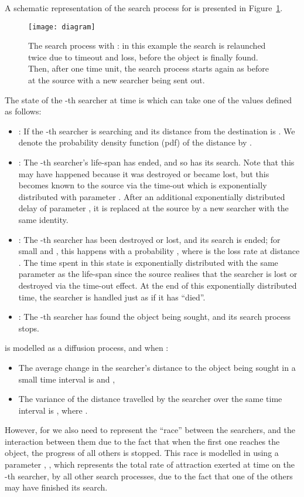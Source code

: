 \documentclass[journal]{IEEEtran}
\begin{document}
A schematic representation of the search process for  is presented in Figure~\ref{diagram}. \begin{figure}[t]\centering
   \texttt{[image: diagram]}
   \caption{The search process with : in this example the search is relaunched twice due to timeout and loss, before the object is finally found. Then, after one time unit, the search process starts again as before at the source with a new searcher being sent out.} \label{diagram}
\end{figure}The state of the -th searcher at time  is  which can take one of the values  defined as follows:
\begin{itemize}
\item : If the -th searcher is searching and its distance from the destination is . We denote the probability density function (pdf) of the distance  by .

\item : The -th searcher's life-span has ended, and so has its search. Note that this may have happened because it was destroyed or became lost, but this becomes known to the source via the time-out which is exponentially distributed with parameter . After an additional exponentially distributed delay of parameter , it is replaced at the source by a new searcher with the same identity.

\item : The -th searcher has been destroyed or lost, and its search is ended; for small  and , this happens with a probability , where  is the loss rate at distance . The time spent in this state is exponentially distributed with the same parameter  as the life-span since the source realises that the searcher is lost or destroyed via the time-out effect. At the end of this exponentially distributed time, the searcher is handled just as if it has ``died''.
\item : The -th searcher has found the object being sought, and its search process stops.
\end{itemize}

 is modelled as a diffusion process, and when :
\begin{itemize}
\item The average change in the searcher's distance to the object being sought in a small time interval  is  and ,
\item The variance of the distance travelled by the searcher over the same time interval is , where .
\end{itemize}
However, for  we also need to represent the ``race'' between the  searchers, and the interaction between them due to the fact that when the first one reaches the object, the progress of all others is stopped. This race is modelled in \cite{Gelenbe2010} using a parameter , , which represents the total rate of attraction exerted at time  on the -th searcher, by all other search processes, due to the fact that one of the others may have finished its search.
\end{document}
